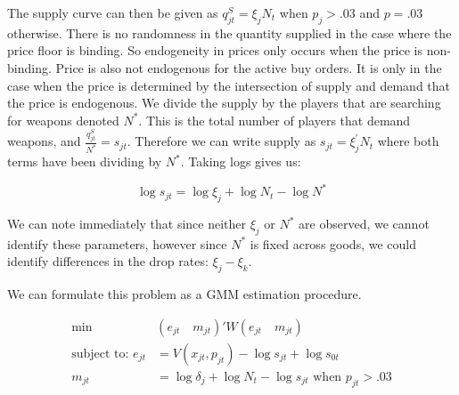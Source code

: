 \documentclass[12pt]{paper}
\begin{document}
The supply curve can then be given as $q_{jt}^S = \xi_{j} N_t$ when
$p_j > .03$ and $p = .03$ otherwise. There is no randomness in the
quantity supplied in the case where the price floor is binding. So
endogeneity in prices only occurs when the price is non-binding. Price
is also not endogenous for the active buy orders. It is only in the
case when the price is determined by the intersection of supply and
demand that the price is endogenous. We divide the supply by the
players that are searching for weapons denoted $N^{*}$. This is the
total number of players that demand weapons, and $\frac{q_{jt}^S }{N^{*}}
= s_{jt}$. Therefore we can write supply as $s_{jt} = \xi_j^{\prime} N_t$
where both terms have been dividing by $N^{*}$. Taking logs gives us:

\begin{equation*}
  \log s_{jt} = \log \xi_j + \log N_t - \log N^{*}
\end{equation*}

We can note immediately that since neither $\xi_j$ or $N^{*}$ are
observed, we cannot identify these parameters, however since $N^{*}$
is fixed across goods, we could identify differences in the drop
rates: $\xi_j - \xi_k$.

We can formulate this problem as a GMM estimation procedure.

\begin{align*}
  \min \quad & (e_{jt} \quad m_{jt} )' W (e_{jt} \quad m_{jt})\\
  \text{subject to: } e_{jt} &= V(x_{jt}, p_{jt}) - \log s_{jt} + \log
  s_{0t}\\
  m_{jt} &= \log \delta_j + \log N_t - \log s_{jt} \text{ when } p_{jt} > .03
\end{align*}
\end{document}
